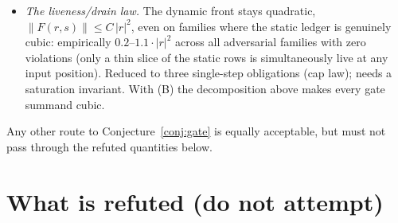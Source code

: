 \documentclass[11pt]{article}
\theoremstyle{remark}
\newcommand{\ZERO}{\mathbf{0}}
\newcommand{\ONE}{\mathbf{1}}
\newcommand{\rs}[1]{\lvert #1\rvert}                 %
\newcommand{\rss}[1]{\lVert #1\rVert}                %
\newcommand{\Fact}{F}
\newcommand{\thy}[1]{\textsf{\small #1}}
\begin{document}
\begin{itemize}
\emph{Status (2026-06-13 09:18, commit \texttt{effa163}).}  (A) is no longer
attacked as a one-shot bound but by a \emph{simultaneous induction} on a
``clean domain'' (every $\mathsf{zw_2}{=}0$ subterm is $\ZERO/\ONE$).  Landed:
the clean-domain passthrough discount (240{,}256 deep samples, zero
violations; STAR branch checked, \thy{discount\_RSTAR\_if\_body\_D}); the
E00--RONE branch map is \emph{complete} (RCHAR \thy{E00\_RONE\_RCHAR}, RALTS
\thy{E00\_RONE\_RALTS\_if\_members}, RSTAR-cond.\ \thy{E00\_RONE\_RSTAR\_if\_body\_D},
SEQ-cond.\ \thy{E00\_RONE\_RSEQ\_if}); the E0 general-$k$ bridge series is in
progress (RCHAR done, \thy{E0\_RCHAR}).  Three pieces remain: (a) the
union-overlap sublemma (the $4\%$ all-members-passthrough RALTS-discount case
where sibling accumulators share imported frontier points); (b) the E0/D
general-$k$ branches; (c) the well-founded assembly induction.  History to
respect: the earlier $\mathsf{zwidth}$ weight (stars floored at one) and the
J$^{*}$ joint invariant were BOTH falsified by depth-$5$ counterexamples after
passing 200k/95k shallow samples --- empirical claims on this problem now
require depth${}\ge 5$ sampling; and \emph{nine} inductive strengthenings are
falsified with recorded counterexamples.  Self-contained problem file:
\texttt{MATHPROBLEM\_ROWCOUNT.md} (repository root) --- do not retry the
falsified strengthenings.
\item[\textbf{(B)}] \emph{The liveness/drain law.}  The dynamic front stays
quadratic, $\rss{\Fact(r,s)}\le C\,\rs{r}^{2}$, even on families where the
static ledger is genuinely cubic: empirically $0.2$--$1.1\cdot\rs{r}^{2}$
across all adversarial families with zero violations (only a thin slice of
the static rows is simultaneously live at any input position).  Reduced to
three single-step obligations (cap law); needs a saturation invariant.
With (B) the decomposition above makes every gate summand cubic.
\end{itemize}

Any other route to Conjecture~\ref{conj:gate} is equally acceptable, but
must not pass through the refuted quantities below.

\section{What is refuted (do not attempt)}\label{sec:refuted}
\end{document}
